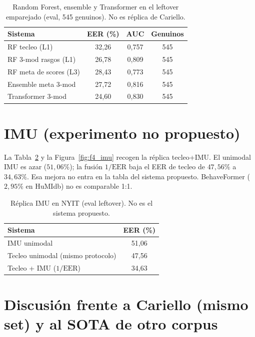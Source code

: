 \begin{table}[H]
\centering
\caption{Random Forest, ensemble y Transformer en el leftover emparejado (eval, 545 genuinos). No es réplica de Cariello.}\label{tab:rf_leftover}
\begin{tabular}{lccc}
\toprule
\textbf{Sistema} & \textbf{EER (\%)} & \textbf{AUC} & \textbf{Genuinos} \\
\midrule
RF tecleo (L1) & 32{,}26 & 0{,}757 & 545 \\
RF 3-mod rasgos (L1) & 26{,}78 & 0{,}809 & 545 \\
RF meta de scores (L3) & 28{,}43 & 0{,}773 & 545 \\
Ensemble meta 3-mod & 27{,}72 & 0{,}816 & 545 \\
Transformer 3-mod & 24{,}60 & 0{,}830 & 545 \\
\bottomrule
\end{tabular}
\end{table}

\section{IMU (experimento no propuesto)}

La Tabla~\ref{tab:imu_replica} y la Figura~\ref{fig:f4_imu} recogen la réplica tecleo+IMU. El unimodal 
IMU es azar ($51{,}06\%$); la fusión $1/\mathrm{EER}$ baja el EER de tecleo de $47{,}56\%$ a 
$34{,}63\%$. Esa mejora no entra en la tabla del sistema propuesto. BehaveFormer ($2{,}95\%$ en 
HuMIdb) no es comparable 1:1.

\begin{table}[H]
\centering
\caption{Réplica IMU en NYIT (eval leftover). No es el sistema propuesto.}\label{tab:imu_replica}
\begin{tabular}{lc}
\toprule
\textbf{Sistema} & \textbf{EER (\%)} \\
\midrule
IMU unimodal & 51{,}06 \\
Tecleo unimodal (mismo protocolo) & 47{,}56 \\
Tecleo + IMU ($1/\mathrm{EER}$) & 34{,}63 \\
\bottomrule
\end{tabular}
\end{table}

\section{Discusión frente a Cariello (mismo set) y al SOTA de otro corpus}

